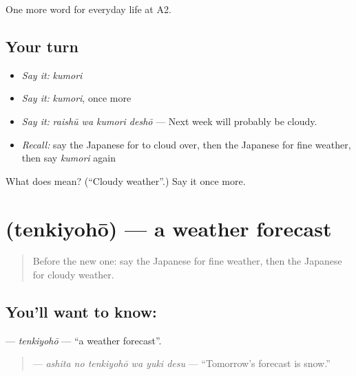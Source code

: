\begin{grammarlens}[title={What you've built}]
One more word for everyday life at A2.
\end{grammarlens}

\subsection*{Your turn}
\begin{itemize}
\raggedright
  \item \emph{Say it:} \emph{kumori}
  \item \emph{Say it:} \emph{kumori}, once more
  \item \emph{Say it:} \emph{raishū wa kumori deshō} — Next week will probably be cloudy.
  \item \emph{Recall:} say the Japanese for to cloud over, then the Japanese for fine weather, then say \emph{kumori} again
\end{itemize}

\begin{tcolorbox}[breakable,colback=teal!4,colframe=teal!35!black,title={Before you move on}]
What does  mean? (\textquotedblleft{}Cloudy weather\textquotedblright{}.) Say it once more.
\end{tcolorbox}
\section[\texorpdfstring{\ja{てんきよほう} (tenkiyohō)}{てんきよほう (tenkiyohō)}]{ (tenkiyohō) — a weather forecast}

\label{lesson:JA-C208-tenkiyohou}



\begin{quote}
Before the new one: say the Japanese for fine weather, then the Japanese for cloudy weather.
\end{quote}

\subsection*{You'll want to know: }
\textbf{} — \emph{tenkiyohō} — \textquotedblleft{}a weather forecast\textquotedblright{}.

\begin{quote}
\textbf{  } — \emph{ashita no tenkiyohō wa yuki desu} — \textquotedblleft{}Tomorrow's forecast is snow.\textquotedblright{}
\end{quote}

